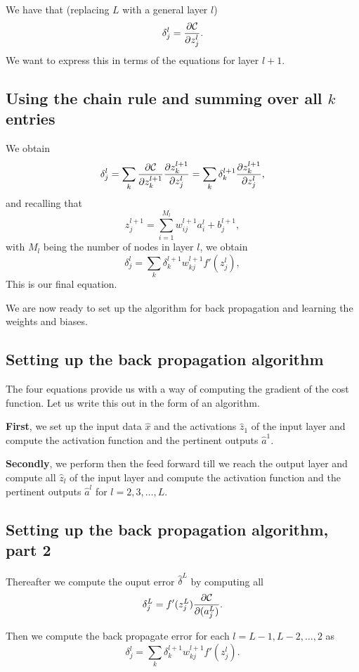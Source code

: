 \documentclass[%
oneside,                 %
final,                   %
10pt]{article}
\begin{document}
We have that (replacing $L$ with a general layer $l$)
\[
\delta_j^l =\frac{\partial {\cal C}}{\partial z_j^l}.
\]
We want to express this in terms of the equations for layer $l+1$.

\subsection{Using the chain rule and summing over all $k$ entries}

We obtain
\[
\delta_j^l =\sum_k \frac{\partial {\cal C}}{\partial z_k^{l+1}}\frac{\partial z_k^{l+1}}{\partial z_j^{l}}=\sum_k \delta_k^{l+1}\frac{\partial z_k^{l+1}}{\partial z_j^{l}},
\]
and recalling that
\[
z_j^{l+1} = \sum_{i=1}^{M_{l}}w_{ij}^{l+1}a_i^{l}+b_j^{l+1},
\]
with $M_l$ being the number of nodes in layer $l$, we obtain
\[
\delta_j^l =\sum_k \delta_k^{l+1}w_{kj}^{l+1}f'(z_j^l),
\]
This is our final equation.

We are now ready to set up the algorithm for back propagation and learning the weights and biases.

\subsection{Setting up the back propagation algorithm}

The four equations  provide us with a way of computing the gradient of the cost function. Let us write this out in the form of an algorithm.

\textbf{First}, we set up the input data $\hat{x}$ and the activations
$\hat{z}_1$ of the input layer and compute the activation function and
the pertinent outputs $\hat{a}^1$.

\textbf{Secondly}, we perform then the feed forward till we reach the output
layer and compute all $\hat{z}_l$ of the input layer and compute the
activation function and the pertinent outputs $\hat{a}^l$ for
$l=2,3,\dots,L$.

\subsection{Setting up the back propagation algorithm, part 2}

Thereafter we compute the ouput error $\hat{\delta}^L$ by computing all
\[
\delta_j^L = f'(z_j^L)\frac{\partial {\cal C}}{\partial (a_j^L)}.
\]

Then we compute the back propagate error for each $l=L-1,L-2,\dots,2$ as
\[
\delta_j^l = \sum_k \delta_k^{l+1}w_{kj}^{l+1}f'(z_j^l).
\]
\end{document}
